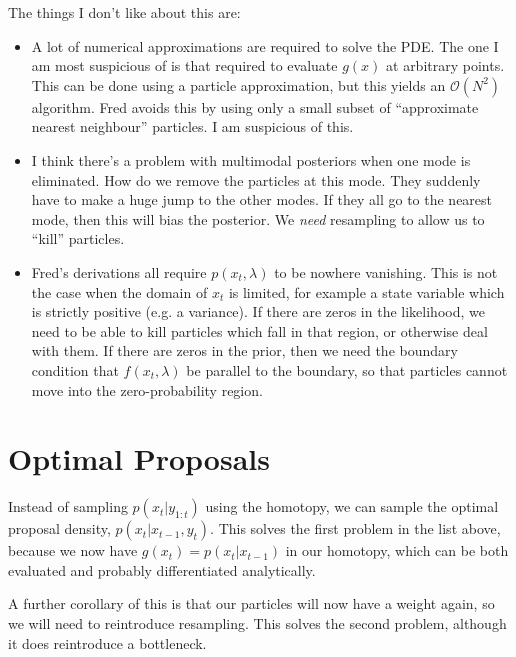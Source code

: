 \documentclass{article}
\begin{document}
The things I don't like about this are:
\begin{itemize}
  \item A lot of numerical approximations are required to solve the PDE. The one I am most suspicious of is that required to evaluate $g(x)$ at arbitrary points. This can be done using a particle approximation, but this yields an $\mathcal{O}(N^2)$ algorithm. Fred avoids this by using only a small subset of ``approximate nearest neighbour'' particles. I am suspicious of this.
  \item I think there's a problem with multimodal posteriors when one mode is eliminated. How do we remove the particles at this mode. They suddenly have to make a huge jump to the other modes. If they all go to the nearest mode, then this will bias the posterior. We \emph{need} resampling to allow us to ``kill'' particles.
  \item Fred's derivations all require $p(x_t,\lambda)$ to be nowhere vanishing. This is not the case when the domain of $x_t$ is limited, for example a state variable which is strictly positive (e.g. a variance). If there are zeros in the likelihood, we need to be able to kill particles which fall in that region, or otherwise deal with them. If there are zeros in the prior, then we need the boundary condition that $f(x_t, \lambda)$ be parallel to the boundary, so that particles cannot move into the zero-probability region.
\end{itemize}



\section{Optimal Proposals}

Instead of sampling $p(x_t | y_{1:t})$ using the homotopy, we can sample the optimal proposal density, $p(x_t | x_{t-1}, y_t)$. This solves the first problem in the list above, because we now have $g(x_t)=p(x_t|x_{t-1})$ in our homotopy, which can be both evaluated and probably differentiated analytically.

A further corollary of this is that our particles will now have a weight again, so we will need to reintroduce resampling. This solves the second problem, although it does reintroduce a bottleneck.
\end{document}
